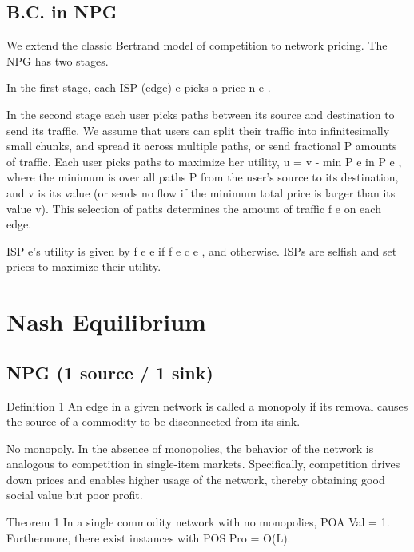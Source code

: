 \documentclass{beamer}
\begin{document}
\subsection{B.C. in NPG}

\begin{frame}
We extend the classic Bertrand model of competition to network pricing. The
NPG has two stages.

In the first stage, each ISP (edge) e picks a price n e .

In the second stage each user picks paths between its source and destination to send
its traffic. We assume that users can split their traffic into infinitesimally small
chunks, and spread it across multiple paths, or send fractional
P amounts of traffic.
Each user picks paths to maximize her utility, u = v - min P e in P e , where the
minimum is over all paths P from the user’s source to its destination, and v is
its value (or sends no flow if the minimum total price is larger than its value v).
This selection of paths determines the amount of traffic f e on each edge.

ISP e’s
utility is given by f e e if f e  c e , and  otherwise. ISPs are selfish and set
prices to maximize their utility.
\end{frame}


\section{Nash Equilibrium}

\subsection{NPG (1 source / 1 sink)}

\begin{frame}
\begin{exampleblock}{Definition 1}
An edge in a given network is called a monopoly if its removal
causes the source of a commodity to be disconnected from its sink.
\end{exampleblock}


No monopoly. In the absence of monopolies, the behavior of the network is
analogous to competition in single-item markets. Specifically, competition drives
down prices and enables higher usage of the network, thereby obtaining good
social value but poor profit.

\begin{block}{Theorem 1}
In a single commodity network with no monopolies, POA Val = 1.
Furthermore, there exist instances with POS Pro = O(L).
\end{block}

\end{frame}
\end{document}
